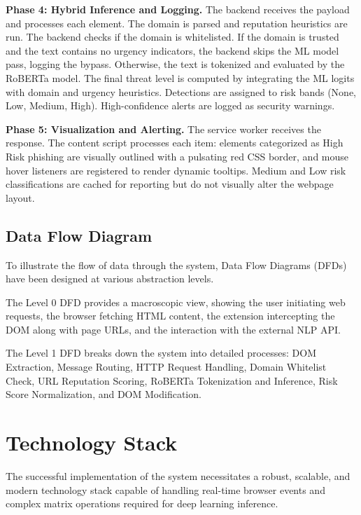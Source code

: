 \textbf{Phase 4: Hybrid Inference and Logging.} The backend receives the payload and processes each element. The domain is parsed and reputation heuristics are run. The backend checks if the domain is whitelisted. If the domain is trusted and the text contains no urgency indicators, the backend skips the ML model pass, logging the bypass. Otherwise, the text is tokenized and evaluated by the RoBERTa model. The final threat level is computed by integrating the ML logits with domain and urgency heuristics. Detections are assigned to risk bands (None, Low, Medium, High). High-confidence alerts are logged as security warnings.

\textbf{Phase 5: Visualization and Alerting.} The service worker receives the response. The content script processes each item: elements categorized as High Risk phishing are visually outlined with a pulsating red CSS border, and mouse hover listeners are registered to render dynamic tooltips. Medium and Low risk classifications are cached for reporting but do not visually alter the webpage layout.

\section{Data Flow Diagram}

To illustrate the flow of data through the system, Data Flow Diagrams (DFDs) have been designed at various abstraction levels.

The Level 0 DFD provides a macroscopic view, showing the user initiating web requests, the browser fetching HTML content, the extension intercepting the DOM along with page URLs, and the interaction with the external NLP API.

The Level 1 DFD breaks down the system into detailed processes: DOM Extraction, Message Routing, HTTP Request Handling, Domain Whitelist Check, URL Reputation Scoring, RoBERTa Tokenization and Inference, Risk Score Normalization, and DOM Modification.


\chapter{Technology Stack}

The successful implementation of the system necessitates a robust, scalable, and modern technology stack capable of handling real-time browser events and complex matrix operations required for deep learning inference.

